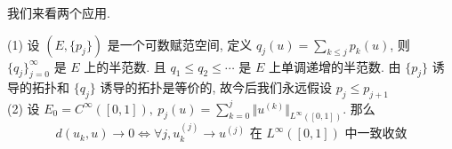 \documentclass[11pt]{ctexart}[UTF8]
\begin{document}
我们来看两个应用.
\begin{example}
    (1) 设 $(E, \{p_j\})$ 是一个可数赋范空间, 定义 $q_j(u) = \sum\limits_{k\leq j} p_k(u)$, 则 $\{q_j\}_{j=0}^{\infty}$ 是 $E$ 上的半范数. 且
    $q_{1} \leq q_{2} \leq \cdots$ 是 $E$ 上单调递增的半范数. 由 $\{ p_{j} \}$ 诱导的拓扑和 $\{ q_{j} \}$ 诱导的拓扑是等价的, 故今后我们永远假设 $p_{j}\leq p_{j+1}$\\
    (2) 设 $E_{0} = C^{\infty}([0,1]),\ p_{j}(u) =\sum\limits_{k=0}^{j}\Vert u^{(k)}\Vert_{L^\infty([0,1])}$. 那么
    \begin{equation*}
        d(u_{k},u) \longrightarrow 0 \Leftrightarrow \forall j,  u_{k}^{(j)} \longrightarrow u^{(j)} \text{ 在 } L^\infty([0,1]) \text{ 中一致收敛}
    \end{equation*}
\end{example}
\end{document}
